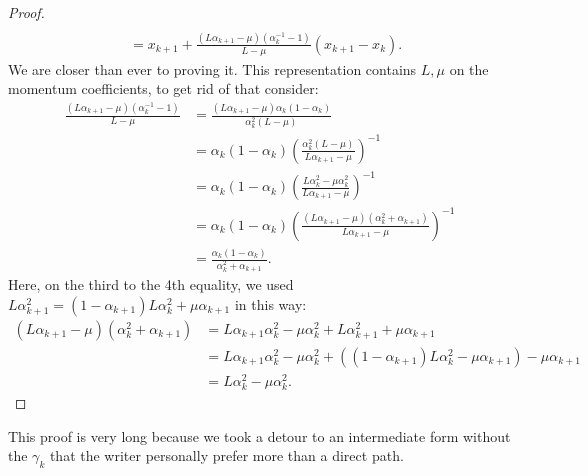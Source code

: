 \documentclass[12pt]{article}
\begin{document}
\begin{proof}
{\begin{align*}
            \\
            &= x_{k + 1} + \frac{(L\alpha_{k + 1} - \mu)(\alpha_k^{-1} - 1)}{L - \mu}(x_{k + 1} - x_k). 
        \end{align*}
        }
        We are closer than ever to proving it. 
        This representation contains $L, \mu$ on the momentum coefficients, to get rid of that consider: 
        \begin{align*}
            \frac{(L\alpha_{k + 1} - \mu)(\alpha_k^{-1} - 1)}{L - \mu}
            &= \frac{(L\alpha_{k + 1} - \mu)\alpha_k(1 - \alpha_k)}{\alpha_k^2(L - \mu)}
            \\
            &= 
            \alpha_k(1 - \alpha_k)
            \left(
                \frac{\alpha_k^2(L - \mu)}{L\alpha_{k + 1} - \mu}
            \right)^{-1}
            \\
            &= \alpha_k(1 - \alpha_k)
            \left(
                \frac{L\alpha_k^2 - \mu\alpha_k^2}{L\alpha_{k + 1} - \mu}
            \right)^{-1}
            \\
            &= 
            \alpha_k(1 - \alpha_k)
            \left(
                \frac{(L\alpha_{k + 1} - \mu)(\alpha_k^2 + \alpha_{k + 1})}
                {L\alpha_{k + 1} - \mu}
            \right)^{-1}
            \\
            &= \frac{\alpha_k(1 - \alpha_k)}{\alpha_k^2 + \alpha_{k + 1}}. 
        \end{align*}
        Here, on the third to the 4th equality, we used $L\alpha_{k + 1}^2 = (1 - \alpha_{k + 1})L\alpha_k^2 + \mu\alpha_{k + 1}$ in this way: 
        \begin{align*}
            (L\alpha_{k + 1} - \mu)(\alpha_k^2 + \alpha_{k + 1})
            &= 
            L\alpha_{k + 1}\alpha_k^2 - \mu \alpha_k^2 + L \alpha_{k + 1}^2 + \mu\alpha_{k + 1}
            \\
            &= 
            L\alpha_{k + 1}\alpha_k^2 - \mu \alpha_k^2 + (
                (1 - \alpha_{k + 1})L\alpha_k^2 - \mu\alpha_{k + 1}
            ) - \mu\alpha_{k + 1}
            \\
            &= 
            L\alpha_k^2 - \mu \alpha_k^2. 
        \end{align*}
    \end{proof}
    \begin{remark}
        This proof is very long because we took a detour to an intermediate form without the $\gamma_k$ that the writer personally prefer more than a direct path. 
    \end{remark}
        
\end{document}
